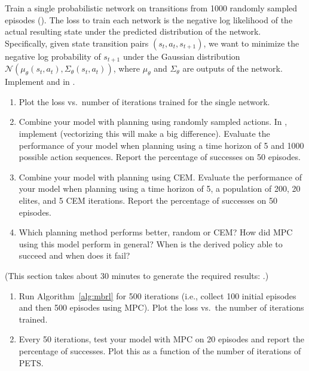 \documentclass[11pt]{article}
\begin{document}
Train a single probabilistic network on transitions from 1000 randomly sampled episodes (). The loss to train each network is the negative log likelihood of the actual resulting state under the predicted distribution of the network. Specifically, given state transition pairs $(s_t, a_t, s_{t+1})$, we want to minimize the negative log probability of $s_{t+1}$ under the Gaussian distribution $\mathcal{N}(\mu_\theta(s_t, a_t), \Sigma_\theta(s_t, a_t))$, where $\mu_\theta$ and $\Sigma_\theta$ are outputs of the network. Implement  and  in .
\begin{enumerate}
  \item {} Plot the loss vs.\ number of iterations trained for the single network.
  \item {} Combine your model with planning using randomly sampled actions. In , implement  (vectorizing this will make a big difference). Evaluate the performance of your model when planning using a time horizon of 5 and 1000 possible action sequences. Report the percentage of successes on 50 episodes.
  \item {} Combine your model with planning using CEM. Evaluate the performance of your model when planning using a time horizon of 5, a population of 200, 20 elites, and 5 CEM iterations. Report the percentage of successes on 50 episodes.
  \item {} Which planning method performs better, random or CEM? How did MPC using this model perform in general? When is the derived policy able to succeed and when does it fail?
\end{enumerate}

(This section takes about 30 minutes to generate the required results: .)
\begin{enumerate}
  \item {} Run Algorithm~\ref{alg:mbrl} for 500 iterations (i.e., collect 100 initial episodes and then 500 episodes using MPC). Plot the loss vs.\ the number of iterations trained.
  \item {} Every 50 iterations, test your model with MPC on 20 episodes and report the percentage of successes. Plot this as a function of the number of iterations of PETS.
\end{enumerate}
\end{document}
